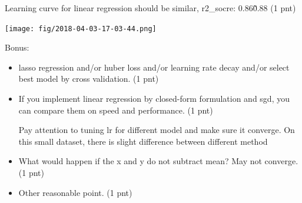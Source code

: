 \documentclass[12pt]{article}
\begin{document}
Learning curve for linear regression  should be similar, r2\_socre: 0.86\~0.88 (1 pnt)

\texttt{[image: fig/2018-04-03-17-03-44.png]}

Bonus:
\begin{itemize}
	\item
		  lasso regression and/or huber loss and/or learning rate decay and/or select best model by cross validation. 
		  (1 pnt)
	\item
		  If you implement linear  regression by  closed-form formulation and sgd, you can compare them on speed and performance. (1 pnt) 

		  Pay attention to tuning lr for different model and make sure it converge.  On this small dataset, there is slight difference between different method 
	\item  What would happen if the x and y do not subtract mean? 
		May not converge. (1 pnt)
		\item Other reasonable point. (1 pnt)
\end{itemize}



\end{document}
